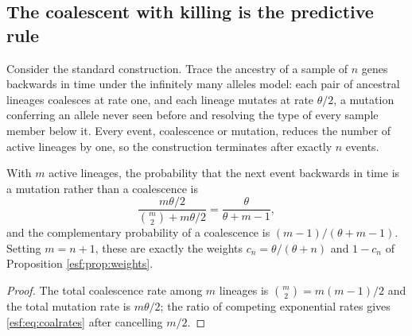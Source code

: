 \subsection{The coalescent with killing is the predictive rule}

Consider the standard construction. Trace the ancestry of a sample of $n$ genes
backwards in time under the infinitely many alleles model: each pair of ancestral
lineages coalesces at rate one, and each lineage mutates at rate $\theta/2$, a
mutation conferring an allele never seen before and resolving the type of every sample
member below it. Every event, coalescence or mutation, reduces the number of active
lineages by one, so the construction terminates after exactly $n$ events.

\begin{proposition}
\label{esf:prop:coal}
With $m$ active lineages, the probability that the next event backwards in time is a
mutation rather than a coalescence is
\begin{equation}
\frac{m \theta / 2}{\binom{m}{2} + m \theta / 2}
= \frac{\theta}{\theta + m - 1},
\label{esf:eq:coalrates}
\end{equation}
and the complementary probability of a coalescence is $(m-1)/(\theta+m-1)$. Setting
$m = n+1$, these are exactly the weights $c_n = \theta/(\theta+n)$ and $1 - c_n$ of
Proposition \ref{esf:prop:weights}.
\end{proposition}

\begin{proof}
The total coalescence rate among $m$ lineages is $\binom{m}{2} = m(m-1)/2$ and the
total mutation rate is $m\theta/2$; the ratio of competing exponential rates gives
\eqref{esf:eq:coalrates} after cancelling $m/2$.
\end{proof}

